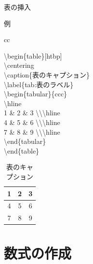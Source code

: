 \documentclass[aspectratio=169, dvipdfmx, 12pt]{beamer}
\begin{document}
\begin{frame}{表の挿入}
  \begin{block}{例}
    \begin{tabular}{cc}
      \begin{minipage}[t]{0.48\hsize}
        \textbackslash begin\{table\}[htbp]\\
        \textbackslash centering\\
        \textbackslash caption\{表のキャプション\}\\
        \textbackslash label\{tab:表のラベル\}\\
        \textbackslash begin\{tabular\}\{c\textbar c\textbar c\}\\
        \textbackslash hline\\
        1 \& 2 \& 3 \textbackslash \textbackslash \textbackslash hline\\
        4 \& 5 \& 6 \textbackslash \textbackslash \textbackslash hline\\
        7 \& 8 \& 9 \textbackslash \textbackslash \textbackslash hline\\
        \textbackslash end\{tabular\}\\
        \textbackslash end\{table\}
      \end{minipage}
      \begin{minipage}[t]{0.48\hsize}
        \begin{table}[htbp]
          \centering
          \caption{表のキャプション}
          \label{tab:表のラベル}
          \begin{tabular}{|c|c|c|}
            \hline
            1 & 2 & 3 \\ \hline
            4 & 5 & 6 \\ \hline
            7 & 8 & 9 \\ \hline
          \end{tabular}
        \end{table}
      \end{minipage}
    \end{tabular}
  \end{block}
\end{frame}

\section{数式の作成}
\end{document}
